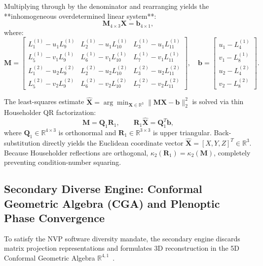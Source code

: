 \documentclass[journal]{IEEEtran}
\begin{document}
Multiplying through by the denominator and rearranging yields the **inhomogeneous overdetermined linear system**:
\begin{equation}
\mathbf{M}_{4 \times 3} \mathbf{X} = \mathbf{b}_{4 \times 1},
\label{eq:tri_system}
\end{equation}
where:
\begin{equation}
\mathbf{M} = \begin{bmatrix}
L_1^{(1)} - u_1 L_9^{(1)} & L_2^{(1)} - u_1 L_{10}^{(1)} & L_3^{(1)} - u_1 L_{11}^{(1)} \\
L_5^{(1)} - v_1 L_9^{(1)} & L_6^{(1)} - v_1 L_{10}^{(1)} & L_7^{(1)} - v_1 L_{11}^{(1)} \\
L_1^{(2)} - u_2 L_9^{(2)} & L_2^{(2)} - u_2 L_{10}^{(2)} & L_3^{(2)} - u_2 L_{11}^{(2)} \\
L_5^{(2)} - v_2 L_9^{(2)} & L_6^{(2)} - v_2 L_{10}^{(2)} & L_7^{(2)} - v_2 L_{11}^{(2)}
\end{bmatrix}, \quad \mathbf{b} = \begin{bmatrix} u_1 - L_4^{(1)} \\ v_1 - L_8^{(1)} \\ u_2 - L_4^{(2)} \\ v_2 - L_8^{(2)} \end{bmatrix}.
\label{eq:M_b_def}
\end{equation}

The least-squares estimate $\hat{\mathbf{X}} = \arg\min_{\mathbf{X} \in \mathbb{R}^3} \|\mathbf{M}\mathbf{X} - \mathbf{b}\|_2^2$ is solved via thin Householder QR factorization:
\begin{equation}
\mathbf{M} = \mathbf{Q}_1 \mathbf{R}_1, \qquad \mathbf{R}_1 \hat{\mathbf{X}} = \mathbf{Q}_1^T \mathbf{b},
\label{eq:qr_backsub}
\end{equation}
where $\mathbf{Q}_1 \in \mathbb{R}^{4 \times 3}$ is orthonormal and $\mathbf{R}_1 \in \mathbb{R}^{3 \times 3}$ is upper triangular. Back-substitution directly yields the Euclidean coordinate vector $\hat{\mathbf{X}} = [X, Y, Z]^T \in \mathbb{R}^3$. Because Householder reflections are orthogonal, $\kappa_2(\mathbf{R}_1) = \kappa_2(\mathbf{M})$, completely preventing condition-number squaring.

\subsection{Secondary Diverse Engine: Conformal Geometric Algebra (CGA) and Plenoptic Phase Convergence}
To satisfy the NVP software diversity mandate, the secondary engine discards matrix projection representations and formulates 3D reconstruction in the 5D Conformal Geometric Algebra $\mathbb{R}^{4,1}$~\cite{dorst2010geometric}.
\end{document}
